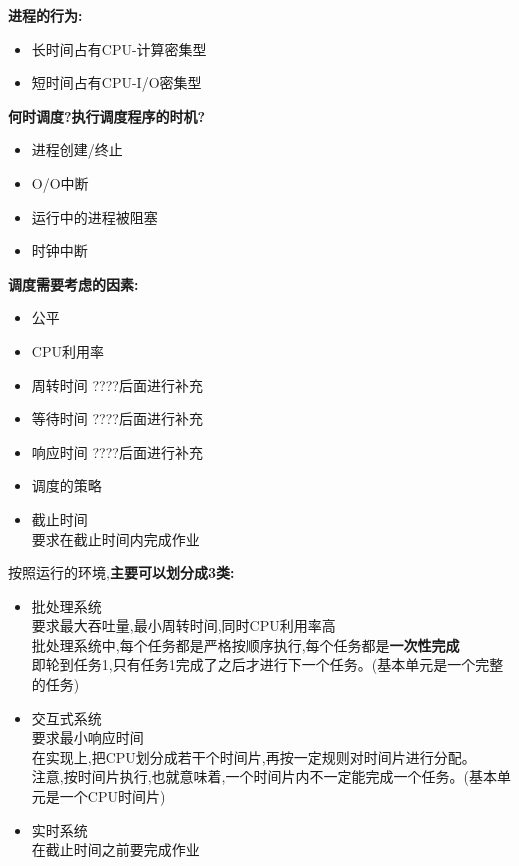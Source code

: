 \documentclass[UTF8,a4paper]{ctexart}
\newcommand{\spaceline}{\vspace{\baselineskip}}
\begin{document}
    \spaceline
    \textbf{进程的行为:}
    \begin{itemize}
      \item 长时间占有CPU-计算密集型
      \item 短时间占有CPU-I/O密集型
    \end{itemize}

    \spaceline
    \textbf{何时调度?执行调度程序的时机?}
    \begin{itemize}
      \item 进程创建/终止
      \item O/O中断
      \item 运行中的进程被阻塞
      \item 时钟中断
    \end{itemize}

    \spaceline
    \textbf{调度需要考虑的因素:}
    \begin{itemize}
      \item 公平
      \item CPU利用率
      \item 周转时间{\color{red} ????后面进行补充}
      \item 等待时间{\color{red} ????后面进行补充}
      \item 响应时间{\color{red} ????后面进行补充}
      \item 调度的策略
      \item 截止时间\\要求在截止时间内完成作业
    \end{itemize}

    \spaceline
    按照运行的环境,\textbf{主要可以划分成3类:}
    \begin{itemize}
      \item 批处理系统\\
      要求最大吞吐量,最小周转时间,同时CPU利用率高\\
      批处理系统中,每个任务都是严格按顺序执行,每个任务都是\textbf{一次性完成}\\
      即轮到任务1,只有任务1完成了之后才进行下一个任务。(基本单元是一个完整的任务)
      \item 交互式系统\\
      要求最小响应时间\\
      在实现上,把CPU划分成若干个时间片,再按一定规则对时间片进行分配。\\
      注意,按时间片执行,也就意味着,一个时间片内不一定能完成一个任务。(基本单元是一个CPU时间片)
      \item 实时系统\\
      在截止时间之前要完成作业
    \end{itemize}
\end{document}
